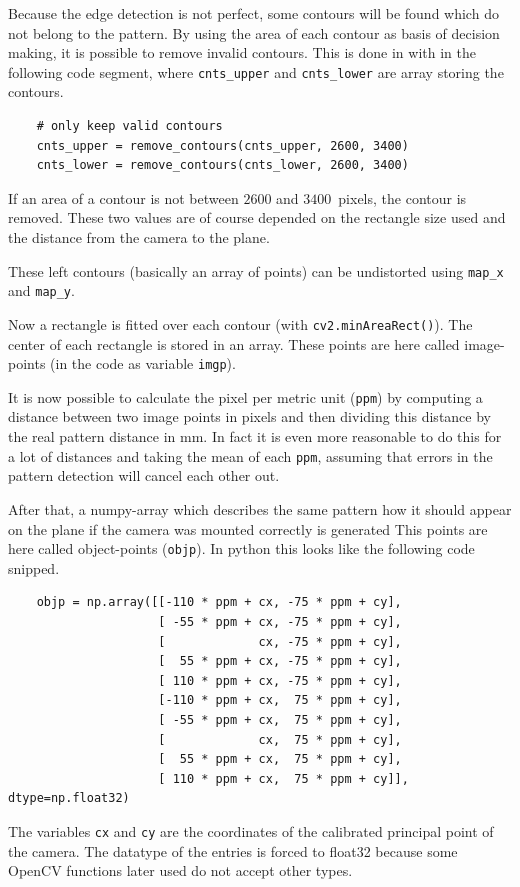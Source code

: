 Because the edge detection is not perfect, some contours will be found which do not belong to the pattern.
By using the area of each contour as basis of decision making, it is possible to remove invalid contours.
This is done in with in the following code segment, where \texttt{cnts\_upper} and \texttt{cnts\_lower} are array storing the contours.
\begin{lstlisting}
	# only keep valid contours
	cnts_upper = remove_contours(cnts_upper, 2600, 3400)
	cnts_lower = remove_contours(cnts_lower, 2600, 3400)
\end{lstlisting}
If an area of a contour is not between $2600$ and $3400\,$ pixels, the contour is removed.
These two values are of course depended on the rectangle size used and the distance from the camera to the plane.

These left contours (basically an array of points) can be undistorted using \texttt{map\_x} and \texttt{map\_y}.

Now a rectangle is fitted over each contour (with \texttt{cv2.minAreaRect()}).
The center of each rectangle is stored in an array.
These points are here called image-points (in the code as variable \texttt{imgp}).

It is now possible to calculate the pixel per metric unit (\texttt{ppm}) by computing a distance between two image points in pixels and then dividing this distance by the real pattern distance in mm.
In fact it is even more reasonable to do this for a lot of distances and taking the mean of each \texttt{ppm}, assuming that errors in the pattern detection will cancel each other out.

After that, a numpy-array which describes the same pattern how it should appear on the plane if the camera was mounted correctly is generated
This points are here called object-points (\texttt{objp}).
In python this looks like the following code snipped.
\begin{lstlisting}
	objp = np.array([[-110 * ppm + cx, -75 * ppm + cy],
	                 [ -55 * ppm + cx, -75 * ppm + cy],
	                 [             cx, -75 * ppm + cy],
	                 [  55 * ppm + cx, -75 * ppm + cy],
	                 [ 110 * ppm + cx, -75 * ppm + cy],
	                 [-110 * ppm + cx,  75 * ppm + cy],
	                 [ -55 * ppm + cx,  75 * ppm + cy],
	                 [             cx,  75 * ppm + cy],
	                 [  55 * ppm + cx,  75 * ppm + cy],
	                 [ 110 * ppm + cx,  75 * ppm + cy]], dtype=np.float32)
\end{lstlisting}
The variables \texttt{cx} and \texttt{cy} are the coordinates of the calibrated principal point of the camera.
The datatype of the entries is forced to float32 because some OpenCV functions later used do not accept other types.

